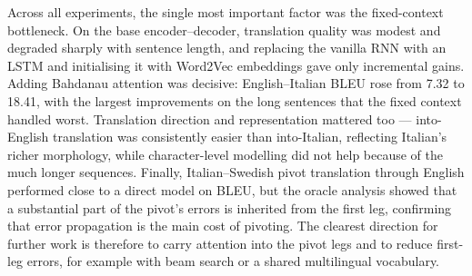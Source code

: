 \documentclass[sigconf,nonacm]{acmart}
\begin{document}
Across all experiments, the single most important factor was the fixed-context
bottleneck. On the base encoder--decoder, translation quality was modest and
degraded sharply with sentence length, and replacing the vanilla RNN with an
LSTM and initialising it with Word2Vec embeddings gave only incremental gains.
Adding Bahdanau attention was decisive: English--Italian BLEU rose from 7.32 to
18.41, with the largest improvements on the long sentences that the fixed
context handled worst. Translation direction and representation mattered too ---
into-English translation was consistently easier than into-Italian, reflecting
Italian's richer morphology, while character-level modelling did not help
because of the much longer sequences. Finally, Italian--Swedish pivot
translation through English performed close to a direct model on BLEU, but the
oracle analysis showed that a substantial part of the pivot's errors is inherited
from the first leg, confirming that error propagation is the main cost of
pivoting. The clearest direction for further work is therefore to carry attention
into the pivot legs and to reduce first-leg errors, for example with beam search
or a shared multilingual vocabulary.
\end{document}
